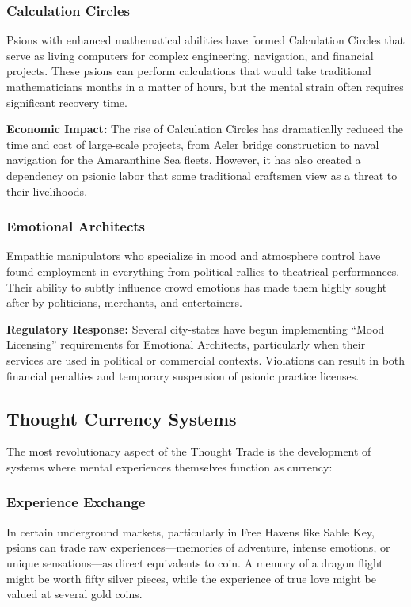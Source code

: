 \documentclass[11pt,twoside]{article}
\begin{document}
\subsubsection{Calculation Circles}
Psions with enhanced mathematical abilities have formed Calculation Circles that serve as living computers for complex engineering, navigation, and financial projects. These psions can perform calculations that would take traditional mathematicians months in a matter of hours, but the mental strain often requires significant recovery time.

\textbf{Economic Impact:} The rise of Calculation Circles has dramatically reduced the time and cost of large-scale projects, from Aeler bridge construction to naval navigation for the Amaranthine Sea fleets. However, it has also created a dependency on psionic labor that some traditional craftsmen view as a threat to their livelihoods.

\subsubsection{Emotional Architects}
Empathic manipulators who specialize in mood and atmosphere control have found employment in everything from political rallies to theatrical performances. Their ability to subtly influence crowd emotions has made them highly sought after by politicians, merchants, and entertainers.

\textbf{Regulatory Response:} Several city-states have begun implementing ``Mood Licensing'' requirements for Emotional Architects, particularly when their services are used in political or commercial contexts. Violations can result in both financial penalties and temporary suspension of psionic practice licenses.

\subsection{Thought Currency Systems}

The most revolutionary aspect of the Thought Trade is the development of systems where mental experiences themselves function as currency:

\subsubsection{Experience Exchange}
In certain underground markets, particularly in Free Havens like Sable Key, psions can trade raw experiences---memories of adventure, intense emotions, or unique sensations---as direct equivalents to coin. A memory of a dragon flight might be worth fifty silver pieces, while the experience of true love might be valued at several gold coins.
\end{document}
